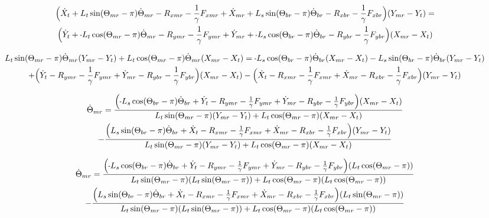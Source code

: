 \documentclass[11pt, landscape]{article}
\newcommand{\mn}{\scalebox{0.7}[1.0]{-}}
\begin{document}
\begin{multline}
\Big ( \dot{X}_{t } + L_{t}\sin(\Theta_{mr}-\pi)  \dot{\Theta}_{mr} - R_{xmr} - \frac{1}{\gamma}F_{xmr} 
+ \dot{X}_{mr} + L_{s}\sin(\Theta_{br}-\pi)  \dot{\Theta}_{br} - R_{xbr} - \frac{1}{\gamma}F_{xbr} \Big ) (Y_{mr} - Y_{t }) = \\
\Big ( \dot{Y}_{t } + \mn L_{t}\cos(\Theta_{mr}-\pi)  \dot{\Theta}_{mr} - R_{ymr} - \frac{1}{\gamma}F_{ymr}
+ \dot{Y}_{mr} + \mn L_{s}\cos(\Theta_{br}-\pi)  \dot{\Theta}_{br} - R_{ybr} - \frac{1}{\gamma}F_{ybr} \Big ) (X_{mr} - X_{t })
\end{multline}

\begin{multline}
L_{t}\sin(\Theta_{mr}-\pi) \dot{\Theta}_{mr} (Y_{mr} - Y_{t }) + L_{t}\cos(\Theta_{mr}-\pi) \dot{\Theta}_{mr} (X_{mr} - X_{t }) =
\mn L_{s}\cos(\Theta_{br}-\pi) \dot{\Theta}_{br} (X_{mr} - X_{t }) - L_{s}\sin(\Theta_{br}-\pi) \dot{\Theta}_{br} (Y_{mr} - Y_{t }) \\
+ \Big ( \dot{Y}_{t } - R_{ymr} - \frac{1}{\gamma}F_{ymr} + \dot{Y}_{mr} - R_{ybr} - \frac{1}{\gamma}F_{ybr} \Big ) (X_{mr} - X_{t }) 
- \Big ( \dot{X}_{t } - R_{xmr} - \frac{1}{\gamma}F_{xmr} + \dot{X}_{mr} - R_{xbr} - \frac{1}{\gamma}F_{xbr} \Big ) (Y_{mr} - Y_{t })
\end{multline}

\begin{multline}
\dot{\Theta}_{mr} =
\frac{\Big( \mn L_{s}\cos(\Theta_{br}-\pi) \dot{\Theta}_{br} + \dot{Y}_{t } - R_{ymr} - \frac{1}{\gamma}F_{ymr} + \dot{Y}_{mr} -R_{ybr} - \frac{1}{\gamma}F_{ybr}\Big) (X_{mr} - X_{t })}
{L_{t}\sin(\Theta_{mr}-\pi)(Y_{mr} - Y_{t}) + L_{t}\cos(\Theta_{mr}-\pi)(X_{mr} - X_{t })} \\
  - \frac{\Big(L_{s}\sin(\Theta_{br}-\pi) \dot{\Theta}_{br} + \dot{X}_{t } - R_{xmr} - \frac{1}{\gamma}F_{xmr} + \dot{X}_{mr} - R_{xbr} -\frac{1}{\gamma}F_{xbr} \Big)(Y_{mr} - Y_{t })}
  {L_{t}\sin(\Theta_{mr}-\pi)(Y_{mr} - Y_{t }) + L_{t}\cos(\Theta_{mr}-\pi)(X_{mr} - X_{t })}
\end{multline}

\begin{multline}
\dot{\Theta}_{mr} =
\frac{\Big( \mn L_{s}\cos(\Theta_{br}-\pi) \dot{\Theta}_{br} + \dot{Y}_{t } - R_{ymr} - \frac{1}{\gamma}F_{ymr} + \dot{Y}_{mr} -R_{ybr} - \frac{1}{\gamma}F_{ybr}\Big) (L_{t}\cos(\Theta_{mr}-\pi))}
{L_{t}\sin(\Theta_{mr}-\pi)(L_{t}\sin(\Theta_{mr}-\pi)) + L_{t}\cos(\Theta_{mr}-\pi)(L_{t}\cos(\Theta_{mr}-\pi))} \\
  - \frac{\Big(L_{s}\sin(\Theta_{br}-\pi) \dot{\Theta}_{br} + \dot{X}_{t } - R_{xmr} - \frac{1}{\gamma}F_{xmr} + \dot{X}_{mr} - R_{xbr} -\frac{1}{\gamma}F_{xbr} \Big)(L_{t}\sin(\Theta_{mr}-\pi))}
  {L_{t}\sin(\Theta_{mr}-\pi)(L_{t}\sin(\Theta_{mr}-\pi)) + L_{t}\cos(\Theta_{mr}-\pi)(L_{t}\cos(\Theta_{mr}-\pi))}
\end{multline}
\end{document}
